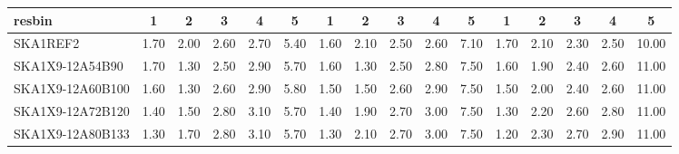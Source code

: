 \begin{table}[H]
{{\begin{tabular}{|lccccc||ccccc||ccccc|}
 resbin  &1 & 2 & 3 & 4 & 5 & 1 & 2 & 3 & 4 & 5 & 1 & 2 & 3 & 4 & 5 \\ \hline
SKA1REF2 & 1.70 \cellcolor{blue!60.00} & 2.00 \cellcolor{red!60.00} & 2.60 \cellcolor{green!32.00} & 2.70 \cellcolor{orange!18.00} & 5.40 \cellcolor{purple!18.00} & 1.60 \cellcolor{blue!60.00} & 2.10 \cellcolor{red!60.00} & 2.50 \cellcolor{green!18.00} & 2.60 \cellcolor{orange!18.00} & 7.10 \cellcolor{purple!18.00} & 1.70 \cellcolor{blue!60.00} & 2.10 \cellcolor{red!39.00} & 2.30 \cellcolor{green!18.00} & 2.50 \cellcolor{orange!18.00} & 10.00 \cellcolor{purple!18.00}\\ \hline 
SKA1X9-12A54B90 & 1.70 \cellcolor{blue!60.00} & 1.30 \cellcolor{red!18.00} & 2.50 \cellcolor{green!18.00} & 2.90 \cellcolor{orange!39.00} & 5.70 \cellcolor{purple!49.50} & 1.60 \cellcolor{blue!60.00} & 1.30 \cellcolor{red!18.00} & 2.50 \cellcolor{green!18.00} & 2.80 \cellcolor{orange!39.00} & 7.50 \cellcolor{purple!60.00} & 1.60 \cellcolor{blue!51.60} & 1.90 \cellcolor{red!18.00} & 2.40 \cellcolor{green!28.50} & 2.60 \cellcolor{orange!28.50} & 11.00 \cellcolor{purple!60.00}\\ \hline 
SKA1X9-12A60B100 & 1.60 \cellcolor{blue!49.50} & 1.30 \cellcolor{red!18.00} & 2.60 \cellcolor{green!32.00} & 2.90 \cellcolor{orange!39.00} & 5.80 \cellcolor{purple!60.00} & 1.50 \cellcolor{blue!46.00} & 1.50 \cellcolor{red!28.50} & 2.60 \cellcolor{green!39.00} & 2.90 \cellcolor{orange!49.50} & 7.50 \cellcolor{purple!60.00} & 1.50 \cellcolor{blue!43.20} & 2.00 \cellcolor{red!28.50} & 2.40 \cellcolor{green!28.50} & 2.60 \cellcolor{orange!28.50} & 11.00 \cellcolor{purple!60.00}\\ \hline 
SKA1X9-12A72B120 & 1.40 \cellcolor{blue!28.50} & 1.50 \cellcolor{red!30.00} & 2.80 \cellcolor{green!60.00} & 3.10 \cellcolor{orange!60.00} & 5.70 \cellcolor{purple!49.50} & 1.40 \cellcolor{blue!32.00} & 1.90 \cellcolor{red!49.50} & 2.70 \cellcolor{green!60.00} & 3.00 \cellcolor{orange!60.00} & 7.50 \cellcolor{purple!60.00} & 1.30 \cellcolor{blue!26.40} & 2.20 \cellcolor{red!49.50} & 2.60 \cellcolor{green!49.50} & 2.80 \cellcolor{orange!49.50} & 11.00 \cellcolor{purple!60.00}\\ \hline 
SKA1X9-12A80B133 & 1.30 \cellcolor{blue!18.00} & 1.70 \cellcolor{red!42.00} & 2.80 \cellcolor{green!60.00} & 3.10 \cellcolor{orange!60.00} & 5.70 \cellcolor{purple!49.50} & 1.30 \cellcolor{blue!18.00} & 2.10 \cellcolor{red!60.00} & 2.70 \cellcolor{green!60.00} & 3.00 \cellcolor{orange!60.00} & 7.50 \cellcolor{purple!60.00} & 1.20 \cellcolor{blue!18.00} & 2.30 \cellcolor{red!60.00} & 2.70 \cellcolor{green!60.00} & 2.90 \cellcolor{orange!60.00} & 11.00 \cellcolor{purple!60.00}\\ \hline 

\end{tabular}}}
\end{table}
